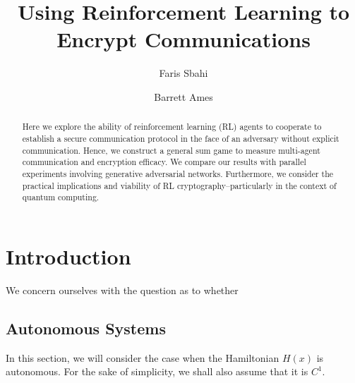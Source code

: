 \documentclass{llncs}
\begin{document}
\title{Using Reinforcement Learning to Encrypt Communications}
%
%
\author{Faris Sbahi \and Barrett Ames}
%
%
%

\maketitle              %

\begin{abstract}
Here we explore the ability of reinforcement learning (RL) agents to cooperate to establish a secure communication protocol in the face of an adversary without explicit communication. Hence, we construct a general sum game to measure multi-agent communication and encryption efficacy. We compare our results with parallel experiments involving generative adversarial networks. Furthermore, we consider the practical implications and viability of RL cryptography--particularly in the context of quantum computing.
\end{abstract}
%
\section{Introduction}
%
We concern ourselves with the question as to whether 

%
\subsection{Autonomous Systems}
%
%
%
%
%
%
%
%
In this section, we will consider the case when the Hamiltonian $H(x)$
is autonomous. For the sake of simplicity, we shall also assume that it
is $C^{1}$.
\end{document}
